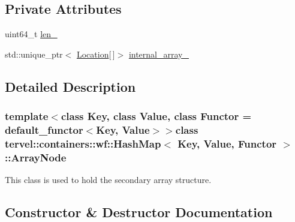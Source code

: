 \subsection*{Private Attributes}
\begin{DoxyCompactItemize}
\item 
uint64\+\_\+t \hyperlink{classtervel_1_1containers_1_1wf_1_1_hash_map_1_1_array_node_a198987828d99d665861b727aa4a85b69}{len\+\_\+}
\item 
std\+::unique\+\_\+ptr$<$ \hyperlink{classtervel_1_1containers_1_1wf_1_1_hash_map_ab2c04cbf19034689a795208e0108fe8a}{Location}\mbox{[}$\,$\mbox{]}$>$ \hyperlink{classtervel_1_1containers_1_1wf_1_1_hash_map_1_1_array_node_a38edcefe8d4958da95ab4a464d23ae33}{internal\+\_\+array\+\_\+}
\end{DoxyCompactItemize}


\subsection{Detailed Description}
\subsubsection*{template$<$class Key, class Value, class Functor = default\+\_\+functor$<$\+Key, Value$>$$>$class tervel\+::containers\+::wf\+::\+Hash\+Map$<$ Key, Value, Functor $>$\+::\+Array\+Node}

This class is used to hold the secondary array structure. 

\subsection{Constructor \& Destructor Documentation}
\hypertarget{classtervel_1_1containers_1_1wf_1_1_hash_map_1_1_array_node_aabfc235f98e6ec20a3f9b717161f1077}{}
